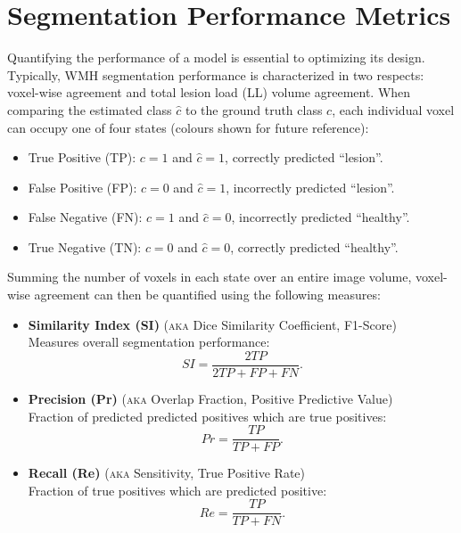 \section{Segmentation Performance Metrics}\label{ss:exp-metrics}
Quantifying the performance of a model is essential to optimizing its design.
Typically, WMH segmentation performance is characterized in two respects:
voxel-wise agreement and total lesion load (LL) volume agreement.
When comparing the estimated class $\hat{c}$ to the ground truth class $c$,
each individual voxel can occupy one of four states (colours shown for future reference):
\begin{itemize}[itemsep=0pt,topsep=0pt]
  \item[\textcolor{green}{\scalebox{0.7}{$\blacksquare$}}]
  True Positive (TP):
  $c = 1$ and $\hat{c} = 1$,
  correctly predicted ``lesion''.
  \item[\textcolor{red}  {\scalebox{0.7}{$\blacksquare$}}]
  False Positive (FP):
  $c = 0$ and $\hat{c} = 1$,
  incorrectly predicted ``lesion''.
  \item[\textcolor{blue} {\scalebox{0.7}{$\blacksquare$}}]
  False Negative (FN):
  $c = 1$ and $\hat{c} = 0$,
  incorrectly predicted ``healthy''.
  \item[\textcolor{black}{\scalebox{0.7}{$\blacksquare$}}]
  True Negative (TN):
  $c = 0$ and $\hat{c} = 0$,
  correctly predicted ``healthy''.
\end{itemize}
Summing the number of voxels in each state over an entire image volume,
voxel-wise agreement can then be quantified using the following measures:
\begin{itemize}
  \item \textbf{Similarity Index (SI)}
  (\textsc{aka} Dice Similarity Coefficient, F1-Score)\\
  Measures overall segmentation performance:
  \begin{equation}
    SI = \dfrac{2TP}{2TP + FP + FN}.%
    \label{eq:si}
  \end{equation}
  \item \textbf{Precision (Pr)}
  (\textsc{aka} Overlap Fraction, Positive Predictive Value)\\
  Fraction of predicted predicted positives which are true positives:
  \begin{equation}
    Pr = \dfrac{TP}{TP+FP}.%
    \label{eq:pr}
  \end{equation}
  \item \textbf{Recall (Re)}
  (\textsc{aka} Sensitivity, True Positive Rate)\\
  Fraction of true positives which are predicted positive:
  \begin{equation}
    Re = \dfrac{TP}{TP+FN}.%
    \label{eq:re}
  \end{equation}
\end{itemize}
